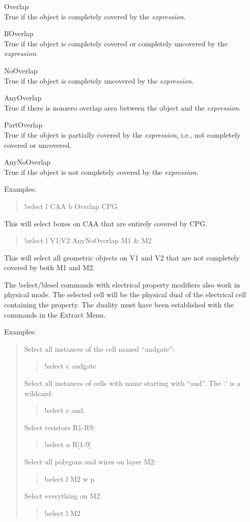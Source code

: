 \begin{description}
\item{\vt Overlap}\\
  True if the object is completely covered by the {\it expression\/}.
\item{\vt IfOverlap}\\
  True if the object is completely covered or completely uncovered
      by the {\it expression\/}.
\item{\vt NoOverlap}\\
  True if the object is completely uncovered by the {\it expression\/}.
\item{\vt AnyOverlap}\\
  True if there is nonzero overlap area between the object and the
  {\it expression\/}.
\item{\vt PartOverlap}\\
  True if the object is partially covered by the {\it expression\/}, i.e.,
  not completely covered or uncovered.
\item{\vt AnyNoOverlap}\\
  True if the object is not completely covered by the {\it expression\/}.
\end{description}
          
Examples:
\begin{quote}
    {\vt !select l CAA b Overlap CPG}
\end{quote}
This will select boxes on CAA that are entirely covered by CPG.

\begin{quote}
    {\vt !select l V1|V2 AnyNoOverlap M1 \& M2}
\end{quote}
This will select all geometric objects on V1 and V2 that are not
completely covered by both M1 and M2.

The {\cb !select}/{\cb !desel} commands with electrical property
modifiers also work in physical mode.  The selected cell will be the
physical dual of the electrical cell containing the property.  The
duality must have been established with the commands in the {\cb
Extract Menu}.

Examples:
\begin{quote}
Select all instances of the cell named ``andgate'':
\begin{quote}\vt
!select c andgate
\end{quote}
Select all instances of cells with name starting with ``and''.  The `.' is
a wildcard:
\begin{quote}\vt
!select c and.
\end{quote}
Select resistors R1-R9:
\begin{quote}\vt
!select n R[1-9]
\end{quote}
Select all polygons and wires on layer M2:
\begin{quote}\vt
!select l M2 w p
\end{quote}
Select everything on M2
\begin{quote}\vt
!select l M2
\end{quote}
\end{quote}

